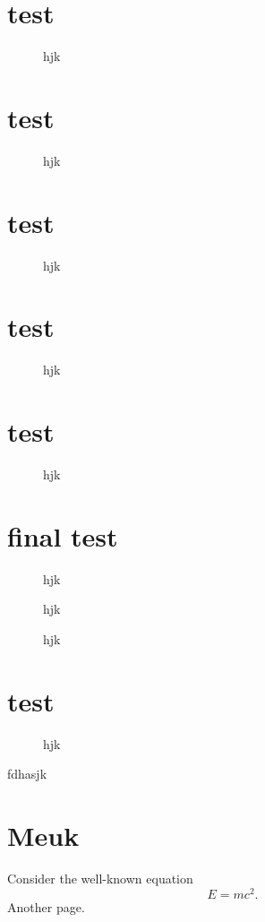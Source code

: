 \documentclass[natbib]{muthesis09}
\newcommand{\bfig}{\begin{figure}}
\newcommand{\efig}{\end{figure}}
\begin{document}
\chapter{test}
\bfig
\vspace{2cm}
\caption{hjk}
\efig
\chapter{test}
\bfig
\vspace{2cm}
\caption{hjk}
\efig
\chapter{test}
\bfig
\vspace{2cm}
\caption{hjk}
\efig
\chapter{test}
\bfig
\vspace{2cm}
\caption{hjk}
\efig
\chapter{test}
\bfig
\vspace{2cm}
\caption{hjk}
\efig
\chapter{final test}
\bfig
\vspace{2cm}
\caption{hjk}
\efig
\newpage\mbox{}
\bfig
\vspace{2cm}
\caption{hjk}
\efig
\newpage\mbox{}
\bfig
\vspace{2cm}
\caption{hjk}
\efig
\newpage\mbox{}
\chapter{test}
\bfig
\vspace{2cm}
\caption{hjk}
\efig
\noindent
fdhasjk
%
\appendix
\chapter{Meuk}
Consider the well-known equation
\begin{equation}
E=mc^2.
\end{equation}
\newpage
Another page.
\biography
\end{document}
